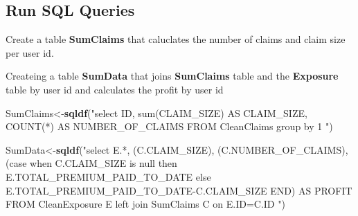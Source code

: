 \documentclass[]{article}
\newenvironment{Shaded}{\begin{snugshade}}{\end{snugshade}}
\newcommand{\KeywordTok}[1]{\textcolor[rgb]{0.13,0.29,0.53}{\textbf{#1}}}
\newcommand{\DataTypeTok}[1]{\textcolor[rgb]{0.13,0.29,0.53}{#1}}
\newcommand{\DecValTok}[1]{\textcolor[rgb]{0.00,0.00,0.81}{#1}}
\newcommand{\StringTok}[1]{\textcolor[rgb]{0.31,0.60,0.02}{#1}}
\newcommand{\OtherTok}[1]{\textcolor[rgb]{0.56,0.35,0.01}{#1}}
\newcommand{\OperatorTok}[1]{\textcolor[rgb]{0.81,0.36,0.00}{\textbf{#1}}}
\newcommand{\NormalTok}[1]{#1}
\begin{document}
\begin{Shaded}
\end{Shaded}

\subsection{Run SQL Queries}\label{run-sql-queries}

Create a table \textbf{SumClaims} that caluclates the number of claims
and claim size per user id.

Createing a table \textbf{SumData} that joins \textbf{SumClaims} table
and the \textbf{Exposure} table by user id and calculates the profit by
user id

\begin{Shaded}
\begin{Highlighting}[]
\NormalTok{SumClaims<-}\KeywordTok{sqldf}\NormalTok{(}\StringTok{"select ID, sum(CLAIM_SIZE) AS CLAIM_SIZE, COUNT(*) AS NUMBER_OF_CLAIMS}
\StringTok{ FROM CleanClaims group by 1 "}\NormalTok{)}

\NormalTok{SumData<-}\KeywordTok{sqldf}\NormalTok{(}\StringTok{"select E.*, (C.CLAIM_SIZE), (C.NUMBER_OF_CLAIMS),}
\StringTok{(case when C.CLAIM_SIZE is null then E.TOTAL_PREMIUM_PAID_TO_DATE else E.TOTAL_PREMIUM_PAID_TO_DATE-C.CLAIM_SIZE END) AS PROFIT}
\StringTok{FROM CleanExposure E left join SumClaims C on E.ID=C.ID "}\NormalTok{)}
\end{Highlighting}
\end{Shaded}
\end{document}
